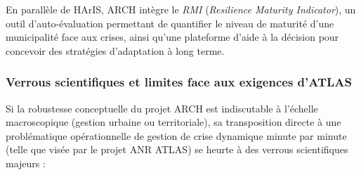 \documentclass{article}
\begin{document}
En parallèle de HArIS, ARCH intègre le \textit{RMI} (\textit{Resilience Maturity Indicator}), un outil d'auto-évaluation permettant de quantifier le niveau de maturité d'une municipalité face aux crises, ainsi qu'une plateforme d'aide à la décision pour concevoir des stratégies d'adaptation à long terme.

\subsubsection{Verrous scientifiques et limites face aux exigences d'ATLAS}

Si la robustesse conceptuelle du projet ARCH est indiscutable à l'échelle macroscopique (gestion urbaine ou territoriale), sa transposition directe à une problématique opérationnelle de gestion de crise dynamique minute par minute (telle que visée par le projet ANR ATLAS) se heurte à des verrous scientifiques majeurs :
\end{document}
